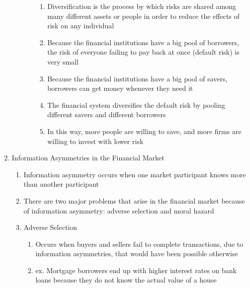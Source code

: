 \documentclass[12pt]{article}
\begin{document}
\begin{enumerate}
\begin{enumerate}
\begin{enumerate}
\begin{enumerate}
                  \item Diversification is the process by which risks are shared among many different assets or people in order to reduce the effects of risk on any individual

                  \item Because the financial institutions have a big pool of borrowers, the risk of everyone failing to pay back at once (default risk) is very small

                  \item Because the financial institutions have a big pool of savers, borrowers can get money whenever they need it

                  \item The financial system diversifies the default risk by pooling different savers and different borrowers

                  \item In this way, more people are willing to save, and more firms are willing to invest with lower risk

                \end{enumerate}

            \end{enumerate}

        \end{enumerate}

      \item Information Asymmetries in the Financial Market

        \begin{enumerate}

          \item Information asymmetry occurs when one market participant knows more than another participant

          \item There are two major problems that arise in the financial market because of information asymmetry: adverse selection and moral hazard

          \item Adverse Selection

            \begin{enumerate}

              \item Occurs when buyers and sellers fail to complete transactions, due to information asymmetries, that would have been possible otherwise

              \item ex. Mortgage borrowers end up with higher interest rates on bank loans because they do not know the actual value of a house


\end{enumerate}
\end{enumerate}
\end{enumerate}
\end{document}
